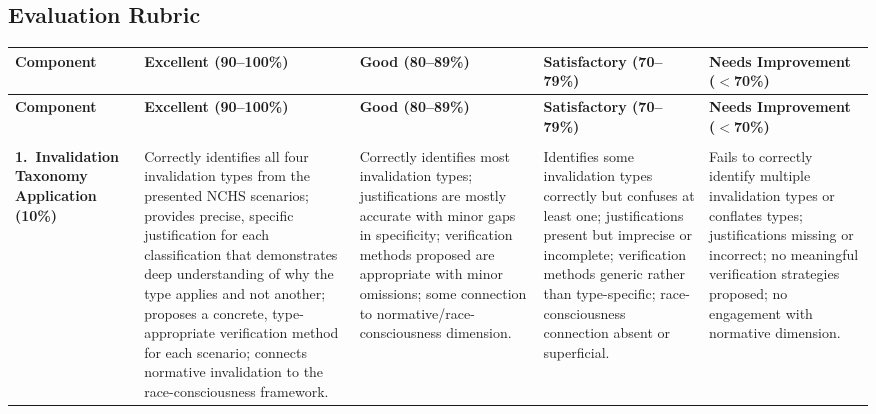 \begin{landscape}

    \section{Evaluation Rubric}

    {\scriptsize

    \begin{longtable}{%
        >{\RaggedRight\arraybackslash}p{2.5cm}   %
        >{\RaggedRight\arraybackslash}p{4.5cm}   %
        >{\RaggedRight\arraybackslash}p{4.2cm}   %
        >{\RaggedRight\arraybackslash}p{4.2cm}   %
        >{\RaggedRight\arraybackslash}p{4.5cm}}  %

    \toprule
    \textbf{Component} &
    \textbf{Excellent (90--100\%)} &
    \textbf{Good (80--89\%)} &
    \textbf{Satisfactory (70--79\%)} &
    \textbf{Needs Improvement ($<$70\%)} \\
    \midrule
    \endfirsthead

    \toprule
    \textbf{Component} &
    \textbf{Excellent (90--100\%)} &
    \textbf{Good (80--89\%)} &
    \textbf{Satisfactory (70--79\%)} &
    \textbf{Needs Improvement ($<$70\%)} \\
    \midrule
    \endhead

    \midrule
    \multicolumn{5}{r}{\textit{Continued on next page}} \\
    \endfoot

    \bottomrule
    \endlastfoot

    \textbf{1.\ Invalidation Taxonomy Application}
    \newline\textbf{(10\%)}
    &
    Correctly identifies all four invalidation types from the
    presented NCHS scenarios; provides precise, specific
    justification for each classification that demonstrates deep
    understanding of why the type applies and not another;
    proposes a concrete, type-appropriate verification method for
    each scenario; connects normative invalidation to the
    race-consciousness framework.
    &
    Correctly identifies most invalidation types; justifications
    are mostly accurate with minor gaps in specificity;
    verification methods proposed are appropriate with minor
    omissions; some connection to normative/race-consciousness
    dimension.
    &
    Identifies some invalidation types correctly but confuses
    at least one; justifications present but imprecise or
    incomplete; verification methods generic rather than
    type-specific; race-consciousness connection absent or
    superficial.
    &
    Fails to correctly identify multiple invalidation types or
    conflates types; justifications missing or incorrect;
    no meaningful verification strategies proposed; no engagement
    with normative dimension.
    \\
    \midrule


\end{longtable}}
\end{landscape}
